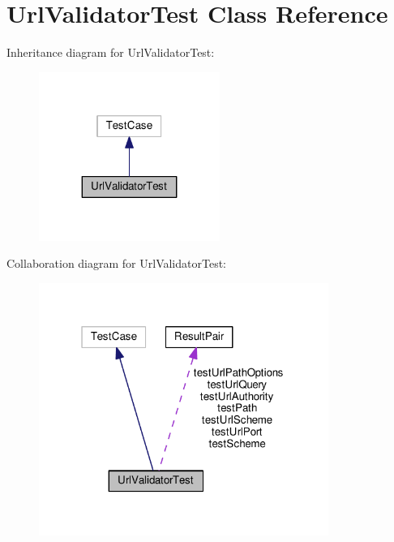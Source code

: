 \hypertarget{classUrlValidatorTest}{}\section{Url\+Validator\+Test Class Reference}
\label{classUrlValidatorTest}


Inheritance diagram for Url\+Validator\+Test\+:
\nopagebreak
\begin{figure}[H]
\begin{center}
\leavevmode
\includegraphics[width=167pt]{classUrlValidatorTest__inherit__graph}
\end{center}
\end{figure}


Collaboration diagram for Url\+Validator\+Test\+:
\nopagebreak
\begin{figure}[H]
\begin{center}
\leavevmode
\includegraphics[width=268pt]{classUrlValidatorTest__coll__graph}
\end{center}
\end{figure}

